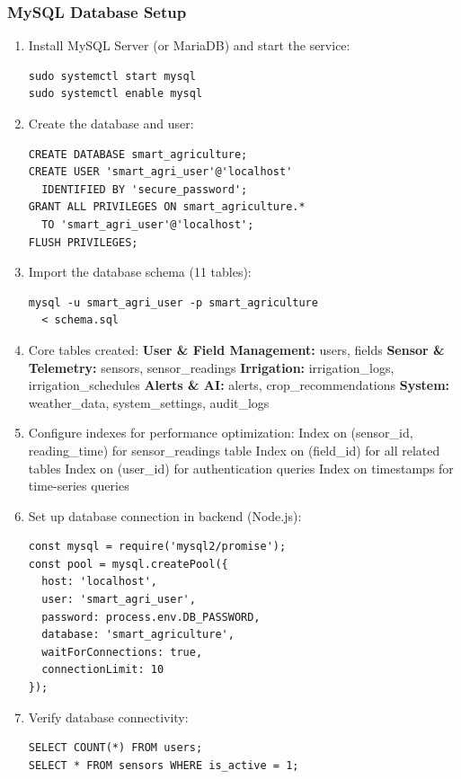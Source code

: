 \subsubsection{MySQL Database Setup}
\begin{enumerate}[leftmargin=1.2cm]
    \item Install MySQL Server (or MariaDB) and start the service:
\begin{verbatim}
sudo systemctl start mysql
sudo systemctl enable mysql
\end{verbatim}

    \item Create the database and user:
\begin{verbatim}
CREATE DATABASE smart_agriculture;
CREATE USER 'smart_agri_user'@'localhost' 
  IDENTIFIED BY 'secure_password';
GRANT ALL PRIVILEGES ON smart_agriculture.* 
  TO 'smart_agri_user'@'localhost';
FLUSH PRIVILEGES;
\end{verbatim}

    \item Import the database schema (11 tables):
\begin{verbatim}
mysql -u smart_agri_user -p smart_agriculture 
  < schema.sql
\end{verbatim}

    \item Core tables created:
    \textbf{User \& Field Management:} users, fields \textbf{Sensor \& Telemetry:} sensors, sensor\_readings \textbf{Irrigation:} irrigation\_logs, irrigation\_schedules \textbf{Alerts \& AI:} alerts, crop\_recommendations \textbf{System:} weather\_data, system\_settings, audit\_logs


    \item Configure indexes for performance optimization:
    Index on (sensor\_id, reading\_time) for sensor\_readings table Index on (field\_id) for all related tables Index on (user\_id) for authentication queries Index on timestamps for time-series queries


    \item Set up database connection in backend (Node.js):
\begin{verbatim}
const mysql = require('mysql2/promise');
const pool = mysql.createPool({
  host: 'localhost',
  user: 'smart_agri_user',
  password: process.env.DB_PASSWORD,
  database: 'smart_agriculture',
  waitForConnections: true,
  connectionLimit: 10
});
\end{verbatim}

    \item Verify database connectivity:
\begin{verbatim}
SELECT COUNT(*) FROM users;
SELECT * FROM sensors WHERE is_active = 1;
\end{verbatim}
\end{enumerate}

